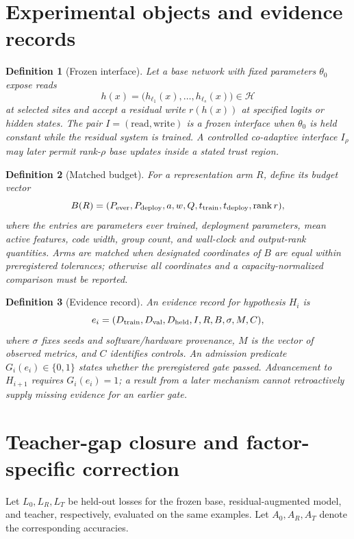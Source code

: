 \documentclass[11pt]{article}
\newtheorem{definition}{Definition}[section]
\newcommand{\cH}{\mathcal H}
\begin{document}
\section{Experimental objects and evidence records}

\begin{definition}[Frozen interface]
Let a base network with fixed parameters $\theta_0$ expose reads
\[
 h(x)=\bigl(h_{\ell_1}(x),\ldots,h_{\ell_s}(x)\bigr)\in\cH
\]
at selected sites and accept a residual write $r(h(x))$ at specified logits or
hidden states.  The pair $I=(\mathrm{read},\mathrm{write})$ is a
\emph{frozen interface} when $\theta_0$ is held constant while the residual
system is trained.  A controlled co-adaptive interface $I_\rho$ may later
permit rank-$\rho$ base updates inside a stated trust region.
\end{definition}

\begin{definition}[Matched budget]
For a representation arm $R$, define its budget vector
\[
 B(R)=(P_{\rm ever},P_{\rm deploy},a,w,Q,t_{\rm train},
       t_{\rm deploy},\operatorname{rank}r),
\]
where the entries are parameters ever trained, deployment parameters, mean
active features, code width, group count, and wall-clock and output-rank
quantities.  Arms are \emph{matched} when designated coordinates of $B$ are
equal within preregistered tolerances; otherwise all coordinates and a
capacity-normalized comparison must be reported.
\end{definition}

\begin{definition}[Evidence record]
An evidence record for hypothesis $H_i$ is
\[
 e_i=(D_{\rm train},D_{\rm val},D_{\rm held},I,R,B,\sigma,M,C),
\]
where $\sigma$ fixes seeds and software/hardware provenance, $M$ is the vector
of observed metrics, and $C$ identifies controls.  An admission predicate
$G_i(e_i)\in\{0,1\}$ states whether the preregistered gate passed.  Advancement
to $H_{i+1}$ requires $G_i(e_i)=1$; a result from a later mechanism cannot
retroactively supply missing evidence for an earlier gate.
\end{definition}

\section{Teacher-gap closure and factor-specific correction}

Let $L_0,L_R,L_T$ be held-out losses for the frozen base, residual-augmented
model, and teacher, respectively, evaluated on the same examples.  Let
$A_0,A_R,A_T$ denote the corresponding accuracies.
\end{document}
